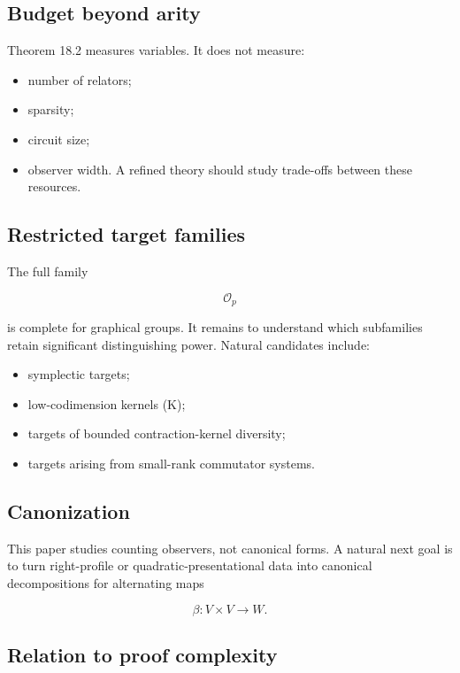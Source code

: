 \documentclass[11pt]{article}
\begin{document}
\subsection{Budget beyond arity}

Theorem 18.2 measures variables. It does not measure:

\begin{itemize}
\item number of relators;
\item sparsity;
\item circuit size;
\item observer width.
A refined theory should study trade-offs between these resources.

\end{itemize}

\subsection{Restricted target families}

The full family

\[
\mathcal O_p
\]

is complete for graphical groups. It remains to understand which subfamilies retain significant distinguishing power. Natural candidates include:

\begin{itemize}
\item symplectic targets;
\item low-codimension kernels (K);
\item targets of bounded contraction-kernel diversity;
\item targets arising from small-rank commutator systems.
\end{itemize}

\subsection{Canonization}

This paper studies counting observers, not canonical forms. A natural next goal is to turn right-profile or quadratic-presentational data into canonical decompositions for alternating maps

\[
\beta:V\times V\to W.
\]

\subsection{Relation to proof complexity}
\end{document}
